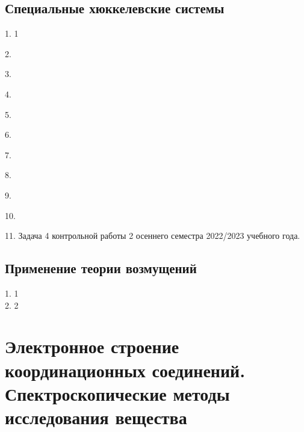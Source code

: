 \subsection{Специальные хюккелевские системы}
1. 1 \par
2. \par
3.  \par
4. \par
5. \par
6. \par
7. \par
8. \par
9.  \par
10.  \par
11. Задача 4 контрольной работы 2 осеннего семестра 2022/2023 учебного года. \par
\newpage

\subsection{Применение теории возмущений}
1. 1 \\
2. 2
\newpage

\section[Спектроскопические методы исследования вещества]{\texorpdfstring{Электронное строение координационных соединений.\\Спектроскопические методы исследования вещества}{Электронное строение координационных соединений. Спектроскопические методы исследования вещества}}
